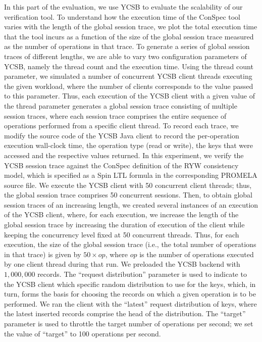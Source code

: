 \documentclass[conference]{IEEEtran}
\begin{document}
	In this part of the evaluation, we use YCSB to evaluate the scalability of our verification tool.  To understand how the execution time of the ConSpec tool varies with the length of  the global session trace, we plot the total execution time that the tool incurs as a function of the size of the global session trace measured as the number of operations in that trace. To generate a series of global session traces of  different lengths, we are able to vary two configuration parameters of YCSB, namely the thread count and the execution time.  %
	Using the thread count parameter, we simulated a number of concurrent YCSB client threads executing the given workload, where the number of clients corresponds to the value passed to this parameter. Thus, each execution of the YCSB client with a given value of the thread parameter generates a global session trace consisting of multiple session traces, where each session trace comprises the entire sequence of operations performed from a specific client thread. To record each trace, we modify the source code of the YCSB Java client to record the per-operation execution wall-clock time, the operation type (read or write), the keys that were accessed and the respective values returned.
	In this experiment, we verify the YCSB session  trace against the ConSpec definition of the RYW consistency model, which is specified as a Spin LTL formula in the corresponding  PROMELA source file.
	We execute the YCSB client with 50 concurrent client threads; thus, the global session  trace comprises 50 concurrent sessions.
	Then, to obtain global session traces of an increasing length, we created several instances of an execution of the YCSB client, where, for each execution, we increase the length of the global session trace by increasing the  duration of execution of the client while keeping the concurrency level fixed at 50 concurrent threads. Thus, for each execution, the size of the global session trace (i.e., the total number of  operations in that trace) is given by $50 \times op$,  where $op$ is the number of operations executed by one client thread during that run.
	We  preloaded the YCSB backend with $1,000,000$ records.  The ``request distribution'' parameter is used to indicate to the YCSB client which specific random distribution to use for the keys, which, in turn, forms the basis for choosing the records on which a given operation is to be performed. We ran the client with the ``latest'' request distribution of keys, where the latest inserted records comprise the head of the distribution. The  ``target'' parameter is used to throttle  the target number of operations per second; we set the value of ``target'' to 100  operations per second. 
\end{document}

